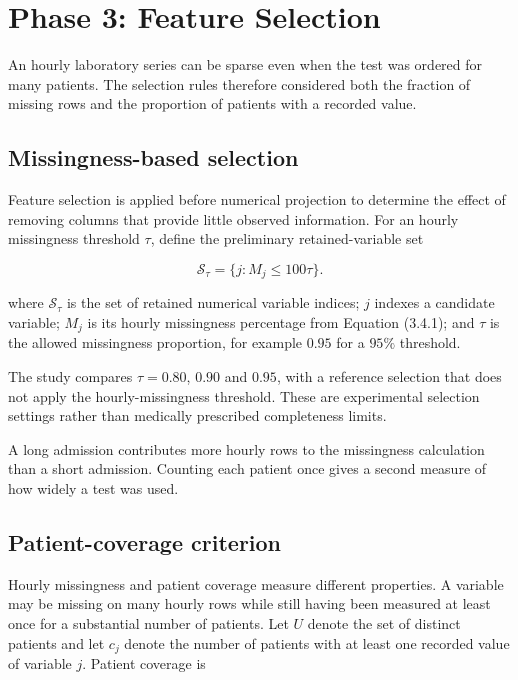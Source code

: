 \section{Phase 3: Feature Selection}\label{phase-3-feature-selection}

\noindent An hourly laboratory series can be sparse even when the test was ordered for many patients. The selection rules therefore considered both the fraction of missing rows and the proportion of patients with a recorded value.

\subsection{Missingness-based selection}\label{missingness-based-selection}

Feature selection is applied before numerical projection to determine
the effect of removing columns that provide little observed information.
For an hourly missingness threshold \(\tau\), define the preliminary
retained-variable set

\[
\mathcal{S}_{\tau}=\{j:M_j\leq100\tau\}.\tag{3.6.1}
\]

\noindent where \(\mathcal{S}_{\tau}\) is the set of retained numerical variable
indices; \(j\) indexes a candidate variable; \(M_j\) is its hourly
missingness percentage from Equation (3.4.1); and \(\tau\) is the
allowed missingness proportion, for example \(0.95\) for a \(95\%\)
threshold.

\noindent The study compares \(\tau=0.80\), \(0.90\) and \(0.95\), with a
reference selection that does not apply the hourly-missingness
threshold. These are experimental selection settings rather than
medically prescribed completeness limits.

\noindent A long admission contributes more hourly rows to the missingness calculation than a short admission. Counting each patient once gives a second measure of how widely a test was used.

\subsection{Patient-coverage criterion}\label{patient-coverage-criterion}

Hourly missingness and patient coverage measure different properties. A
variable may be missing on many hourly rows while still having been
measured at least once for a substantial number of patients. Let \(U\)
denote the set of distinct patients and let \(c_j\) denote the number of
patients with at least one recorded value of variable \(j\). Patient
coverage is

